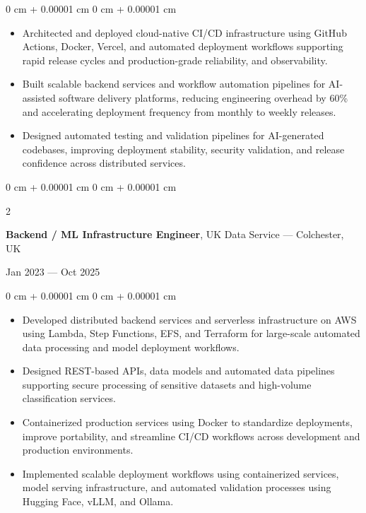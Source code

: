 \documentclass[6pt, letterpaper]{article}
\newenvironment{highlights}{
    \begin{itemize}[
        topsep=0.03 cm,
        parsep=0.03 cm,
        partopsep=0pt,
        itemsep=0pt,
        leftmargin=0 cm + 10pt
    ]
}{
    \end{itemize}
} %
\newenvironment{onecolentry}{
    \begin{adjustwidth}{
        0 cm + 0.00001 cm
    }{
        0 cm + 0.00001 cm
    }
}{
    \end{adjustwidth}
} %
\newenvironment{twocolentry}[2][]{
    \onecolentry
    \def\secondColumn{#2}
    \setcolumnwidth{\fill, 4.5 cm}
    \begin{paracol}{2}
}{
    \switchcolumn \raggedleft \secondColumn
    \end{paracol}
    \endonecolentry
} %
\begin{document}
        \begin{onecolentry}
        \begin{highlights}
            \item Architected and deployed cloud-native CI/CD infrastructure using GitHub Actions, Docker, Vercel, and automated deployment workflows supporting rapid release cycles and production-grade reliability, and observability.
            \item Built scalable backend services and workflow automation pipelines for AI-assisted software delivery platforms, reducing engineering overhead by 60\% and accelerating deployment frequency from monthly to weekly releases.
            \item Designed automated testing and validation pipelines for AI-generated codebases, improving deployment stability, security validation, and release confidence across distributed services.
        \end{highlights}
        \end{onecolentry}

        \begin{twocolentry}{Jan 2023 --- Oct 2025}
        \textbf{Backend / ML Infrastructure Engineer}, UK Data Service --- Colchester, UK
        \end{twocolentry}

        \begin{onecolentry}
        \begin{highlights}

            \item Developed distributed backend services and serverless infrastructure on AWS using Lambda, Step Functions, EFS, and Terraform for large-scale automated data processing and model deployment workflows.
            \item Designed REST-based APIs, data models and automated data pipelines supporting secure processing of sensitive datasets and high-volume classification services.
            \item Containerized production services using Docker to standardize deployments, improve portability, and streamline CI/CD workflows across development and production environments.
            \item Implemented scalable deployment workflows using containerized services, model serving infrastructure, and automated validation processes using Hugging Face, vLLM, and Ollama.
        \end{highlights}
        \end{onecolentry}
\end{document}
